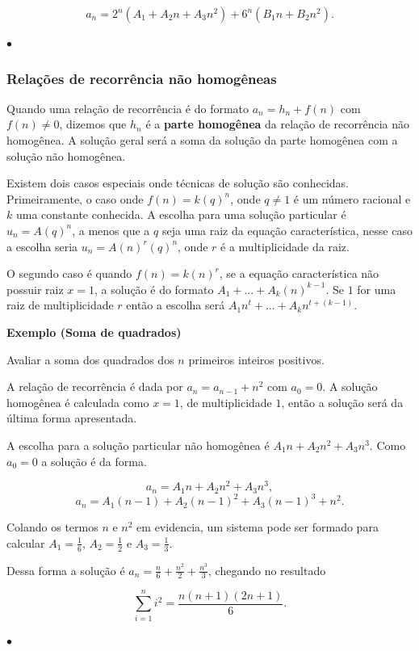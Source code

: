 \[a_n = 2^n(A_1 + A_2n + A_3n^2) + 6^n(B_1n + B_2n^2).\]

{\raggedleft $\bullet$ \par}

\subsubsection{Relações de recorrência não homogêneas}

Quando uma relação de recorrência é do formato $a_n = h_n + f(n)$ com $f(n) \neq 0$, dizemos que $h_n$ é a \textbf{parte homogênea} da relação de recorrência não homogênea. A solução geral será a soma da solução da parte homogênea com a solução não homogênea.

Existem dois casos especiais onde técnicas de solução são conhecidas. Primeiramente, o caso onde $f(n) = k(q)^n$, onde $q \neq 1$ é um número racional e $k$ uma constante conhecida. A escolha para uma solução particular é $u_n = A(q)^n$, a menos que a $q$ seja uma raiz da equação característica, nesse caso a escolha seria $u_n = A(n)^r(q)^n$, onde $r$ é a multiplicidade da raiz.

O segundo caso é quando $f(n) = k(n)^r$, se a equação característica não possuir raiz $x = 1$, a solução é do formato $A_1 + ... + A_k(n)^{k-1}$. Se $1$ for uma raiz de multiplicidade $r$ então a escolha será $A_1n^t + ... + A_kn^{t+(k-1)}$.

\textbf{Exemplo (Soma de quadrados)} 

Avaliar a soma dos quadrados dos $n$ primeiros inteiros positivos.

A relação de recorrência é dada por $a_n = a_{n-1} + n^2$ com $a_0 = 0$. A solução homogênea é calculada como $x = 1$, de multiplicidade $1$, então a solução será da última forma apresentada.

A escolha para a solução particular não homogênea é $A_1n + A_2n^2 + A_3n^3$. Como $a_0 = 0$ a solução é da forma.

\[a_n = A_1n + A_2n^2 + A_3n^3,\]
\[a_n  = A_1(n-1) + A_2(n-1)^2 + A_3(n-1)^3 + n^2.\]

Colando os termos $n$ e $n^2$ em evidencia, um sistema pode ser formado para calcular $A_1 = \frac{1}{6}$, $A_2 = \frac{1}{2}$ e $A_3 = \frac{1}{3}$.

Dessa forma a solução é $a_n = \frac{n}{6} + \frac{n^2}{2} + \frac{n^3}{3}$, chegando no resultado

\[\sum_{i=1}^{n} i^2 = \frac{n(n+1)(2n+1)}{6}.\]

{\raggedleft $\bullet$ \par}
